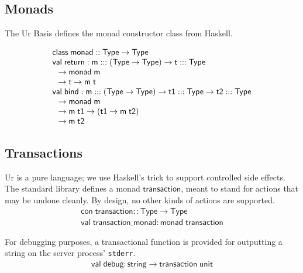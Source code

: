 \documentclass{article}
\newcommand{\mt}[1]{\mathsf{#1}}
\begin{document}
\subsection{Monads}

The Ur Basis defines the monad constructor class from Haskell.

$$\begin{array}{l}
  \mt{class} \; \mt{monad} :: \mt{Type} \to \mt{Type} \\
  \mt{val} \; \mt{return} : \mt{m} ::: (\mt{Type} \to \mt{Type}) \to \mt{t} ::: \mt{Type} \\
  \hspace{.1in} \to \mt{monad} \; \mt{m} \\
  \hspace{.1in} \to \mt{t} \to \mt{m} \; \mt{t} \\
  \mt{val} \; \mt{bind} : \mt{m} ::: (\mt{Type} \to \mt{Type}) \to \mt{t1} ::: \mt{Type} \to \mt{t2} ::: \mt{Type} \\
  \hspace{.1in} \to \mt{monad} \; \mt{m} \\
  \hspace{.1in} \to \mt{m} \; \mt{t1} \to (\mt{t1} \to \mt{m} \; \mt{t2}) \\
  \hspace{.1in} \to \mt{m} \; \mt{t2}
\end{array}$$

\subsection{Transactions}

Ur is a pure language; we use Haskell's trick to support controlled side effects.  The standard library defines a monad $\mt{transaction}$, meant to stand for actions that may be undone cleanly.  By design, no other kinds of actions are supported.
$$\begin{array}{l}
  \mt{con} \; \mt{transaction} :: \mt{Type} \to \mt{Type} \\
  \mt{val} \; \mt{transaction\_monad} : \mt{monad} \; \mt{transaction}
\end{array}$$

For debugging purposes, a transactional function is provided for outputting a string on the server process' \texttt{stderr}.
$$\begin{array}{l}
  \mt{val} \; \mt{debug} : \mt{string} \to \mt{transaction} \; \mt{unit}
\end{array}$$
\end{document}
